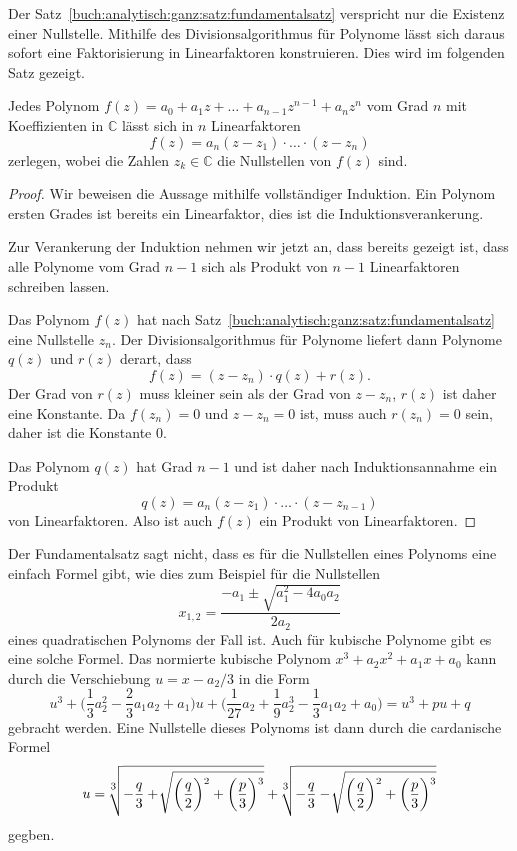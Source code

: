 Der Satz~\ref{buch:analytisch:ganz:satz:fundamentalsatz}
verspricht nur die Existenz einer Nullstelle.
Mithilfe des Divisionsalgorithmus für Polynome lässt sich
daraus sofort eine Faktorisierung in Linearfaktoren konstruieren.
Dies wird im folgenden Satz gezeigt.

\begin{satz}
Jedes Polynom $f(z) = a_0 + a_1z + \ldots + a_{n-1}z^{n-1} + a_nz^n$
vom Grad $n$ mit Koeffizienten in $\mathbb{C}$ lässt sich in $n$
Linearfaktoren
\[
f(z)
=
a_n
(z - z_1)
\cdot
\ldots
\cdot
(z - z_n)
\]
zerlegen, wobei die Zahlen $z_k\in\mathbb{C}$ die Nullstellen von
$f(z)$ sind.
\end{satz}

\begin{proof}
Wir beweisen die Aussage mithilfe vollständiger Induktion.
Ein Polynom ersten Grades ist bereits ein Linearfaktor, dies ist die
Induktionsverankerung.

Zur Verankerung der Induktion nehmen wir jetzt an, dass bereits gezeigt
ist, dass alle Polynome vom Grad $n-1$ sich als Produkt von $n-1$
Linearfaktoren schreiben lassen.

Das Polynom $f(z)$ hat nach
Satz~\ref{buch:analytisch:ganz:satz:fundamentalsatz} eine
Nullstelle $z_n$.
Der Divisionsalgorithmus für Polynome liefert dann Polynome
$q(z)$ und $r(z)$ derart, dass
\[
f(z) = (z-z_n)\cdot q(z) + r(z).
\]
Der Grad von $r(z)$ muss kleiner sein als der Grad von $z-z_n$,
$r(z)$ ist daher eine Konstante.
Da $f(z_n)=0$ und $z-z_n=0$ ist, muss auch $r(z_n)=0$ sein, daher
ist die Konstante $0$.

Das Polynom $q(z)$ hat Grad $n-1$ und ist daher nach Induktionsannahme
ein Produkt
\[
q(z)
=
a_n(z-z_1)\cdot\ldots\cdot (z-z_{n-1})
\]
von Linearfaktoren.
Also ist auch $f(z)$ ein Produkt von Linearfaktoren.
\end{proof}

Der Fundamentalsatz sagt nicht, dass es für die Nullstellen eines
Polynoms eine einfach Formel gibt, wie dies zum Beispiel für die
Nullstellen
\[
x_{1,2}
=
\frac{-a_1\pm\!\sqrt{a_1^2-4a_0a_2}}{2a_2}
\]
eines quadratischen Polynoms der Fall ist.
Auch für kubische Polynome gibt es eine solche Formel.
Das normierte kubische Polynom $x^3+a_2x^2+a_1x+a_0$ 
kann durch die Verschiebung $u = x-a_2/3$ 
in die Form
\[
u^3
+
\biggl(
\frac13 a_2^2
-\frac23 a_1a_2
+a_1
\biggr)
u
+
\biggl(
\frac{1}{27} a_2
+
\frac19 a_2^3
-\frac13 a_1a_2
+
a_0
\biggr)
=
u^3 + pu + q
\]
gebracht werden.
Eine Nullstelle dieses Polynoms ist dann durch die cardanische Formel
%
\[
u
=
\!\sqrt[\scriptstyle3]{
-\frac{q}3+\!\sqrt{
\rlap{$\raisebox{0.5pt}{\phantom{\bigg|}}$}
\smash{
\biggl(\frac{q}2\biggr)^{\raisebox{-2pt}{$\scriptstyle 2$}}
+
\biggl(\frac{p}3\biggr)^{\raisebox{-2pt}{$\scriptstyle 3$}}
}}
}
+
\!\sqrt[\scriptstyle3]{
-\frac{q}3-\!\sqrt{
\rlap{$\raisebox{0.5pt}{\phantom{\bigg|}}$}
\smash{
\biggl(\frac{q}2\biggr)^{\raisebox{-2pt}{$\scriptstyle 2$}}
+
\biggl(\frac{p}3\biggr)^{\raisebox{-2pt}{$\scriptstyle 3$}}
}}
}
\]
gegben.

